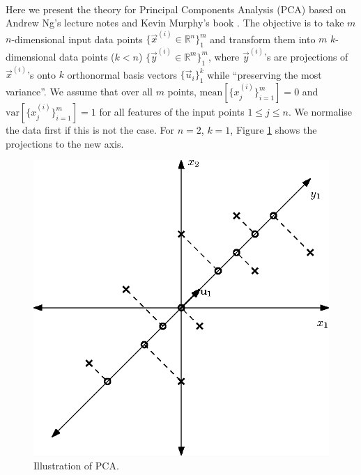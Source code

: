 \paragraph{}
	Here we present the theory for Principal Components Analysis (PCA) based on Andrew Ng's lecture notes \cite{ng13} and Kevin Murphy's book \cite{mlBook}. The objective is to take $m$ $n$-dimensional input data points $\{\vec x^{(i)} \in \mathbb{R}^n\}_1^m$ and transform them into $m$ $k$-dimensional data points ($k<n$) $\{\vec y^{(i)} \in \mathbb{R}^m\}_1^m$, where $\vec y^{(i)}$'s are projections of $\vec x^{(i)}$'s onto $k$ orthonormal basis vectors $\{\vec u_i\}_1^k$ while ``preserving the most variance''. We assume that over all $m$ points, $\text{mean}\left[\{x^{(i)}_j\}_{i = 1}^m\right] = 0$ and $\text{var}\left[\{x^{(i)}_j\}_{i = 1}^m\right] = 1$ for all features of the input points $1 \leq j \leq n$. We normalise the data first if this is not the case. For $n = 2$, $k = 1$, Figure \ref{fig:pca} shows the projections to the new axis.
\begin{figure}[h!]
	\centering
		\includegraphics{drawings/pca.eps}
	\caption{Illustration of PCA.}
	\label{fig:pca}
\end{figure}

